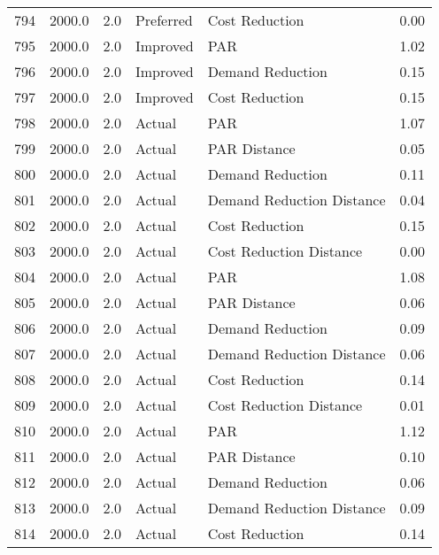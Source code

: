 \begin{longtable}{lrrllr}
794  &       2000.0 &     2.0 &      Preferred &             Cost Reduction &   0.00 \\
795  &       2000.0 &     2.0 &       Improved &                        PAR &   1.02 \\
796  &       2000.0 &     2.0 &       Improved &           Demand Reduction &   0.15 \\
797  &       2000.0 &     2.0 &       Improved &             Cost Reduction &   0.15 \\
798  &       2000.0 &     2.0 &         Actual &                        PAR &   1.07 \\
799  &       2000.0 &     2.0 &         Actual &               PAR Distance &   0.05 \\
800  &       2000.0 &     2.0 &         Actual &           Demand Reduction &   0.11 \\
801  &       2000.0 &     2.0 &         Actual &  Demand Reduction Distance &   0.04 \\
802  &       2000.0 &     2.0 &         Actual &             Cost Reduction &   0.15 \\
803  &       2000.0 &     2.0 &         Actual &    Cost Reduction Distance &   0.00 \\
804  &       2000.0 &     2.0 &         Actual &                        PAR &   1.08 \\
805  &       2000.0 &     2.0 &         Actual &               PAR Distance &   0.06 \\
806  &       2000.0 &     2.0 &         Actual &           Demand Reduction &   0.09 \\
807  &       2000.0 &     2.0 &         Actual &  Demand Reduction Distance &   0.06 \\
808  &       2000.0 &     2.0 &         Actual &             Cost Reduction &   0.14 \\
809  &       2000.0 &     2.0 &         Actual &    Cost Reduction Distance &   0.01 \\
810  &       2000.0 &     2.0 &         Actual &                        PAR &   1.12 \\
811  &       2000.0 &     2.0 &         Actual &               PAR Distance &   0.10 \\
812  &       2000.0 &     2.0 &         Actual &           Demand Reduction &   0.06 \\
813  &       2000.0 &     2.0 &         Actual &  Demand Reduction Distance &   0.09 \\
814  &       2000.0 &     2.0 &         Actual &             Cost Reduction &   0.14 \\

\end{longtable}
